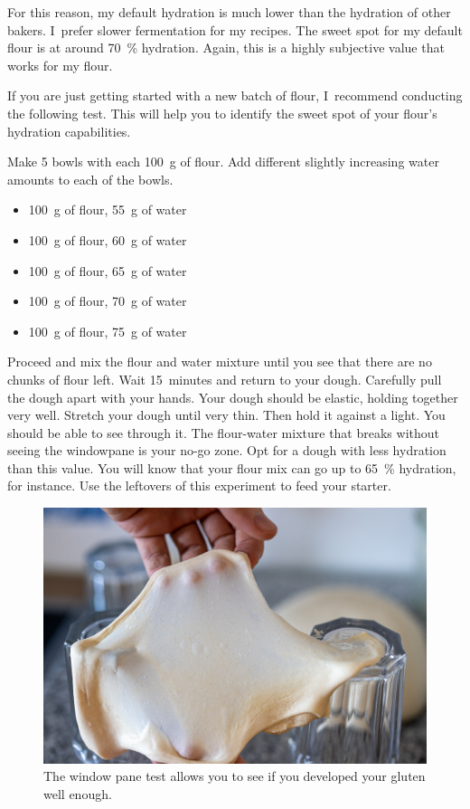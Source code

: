 For this reason, my default hydration is much lower than the hydration of other
bakers. I~prefer slower fermentation for my recipes.
The sweet spot for my default flour is at around \qty{70}{\percent} hydration.
Again, this is a highly subjective value that works for my flour.

If you are just getting started with a new batch of flour,
I~recommend conducting the following test. This will help you to
identify the sweet spot of your flour's hydration capabilities.

Make 5 bowls with each \qty{100}{\gram} of flour. Add different slightly increasing
water amounts to each of the bowls.

\begin{itemize}
  \item \qty{100}{\gram} of flour, \qty{55}{\gram} of water
  \item \qty{100}{\gram} of flour, \qty{60}{\gram} of water
  \item \qty{100}{\gram} of flour, \qty{65}{\gram} of water
  \item \qty{100}{\gram} of flour, \qty{70}{\gram} of water
  \item \qty{100}{\gram} of flour, \qty{75}{\gram} of water
\end{itemize}

Proceed and mix the flour and water mixture until you see that there
are no chunks of flour left. Wait 15~minutes and return to your dough.
Carefully pull the dough apart with your hands. Your dough should be elastic, holding
together very well. Stretch your dough until very thin. Then hold it against a light.
You should be able to see through it. The flour-water mixture that breaks without
seeing the windowpane is your no-go zone. Opt for a dough with
less hydration than this value. You will know that your flour mix can go up to
 \qty{65}{\percent} hydration, for instance. Use the leftovers of this experiment
to feed your starter.


\begin{figure}[!htb]
  \includegraphics[width=\textwidth]{window-pane-effect}
  \caption[The window pane test]{The window pane test allows you to see if you
      developed your gluten well enough.}
\end{figure}


